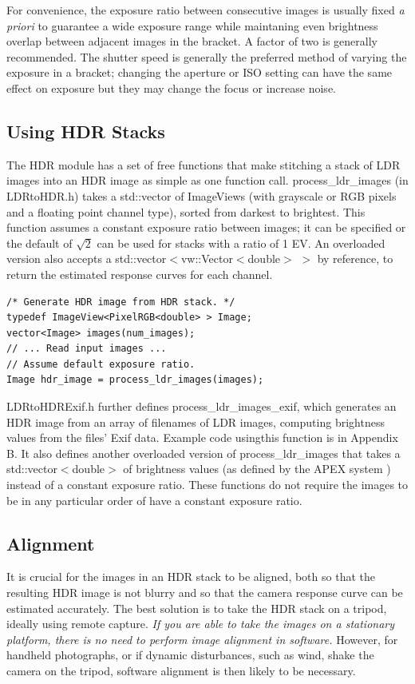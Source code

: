 For convenience, the exposure ratio between consecutive images is
usually fixed {\em a priori} to guarantee a wide exposure range while
maintaning even brightness overlap between adjacent images in the
bracket. A factor of two is generally recommended.  The shutter speed
is generally the preferred method of varying the exposure in a
bracket; changing the aperture or ISO setting can have the same effect
on exposure but they may change the focus or increase noise.

\subsection{Using HDR Stacks}
The HDR module has a set of free functions that make stitching a stack of LDR
images into an HDR image as simple as one function call. process\_ldr\_images (in 
LDRtoHDR.h) takes a std::vector of ImageViews (with grayscale or RGB pixels
and a floating point channel type), sorted from darkest to brightest. This
function assumes a constant exposure ratio between images; it can be specified
or the default of $\sqrt{2}$ can be used for stacks with a ratio of 1 EV. An
overloaded version also accepts a std::vector$<$vw::Vector$<$double$>$ $>$ by reference,
to return the estimated response curves for each channel.

\begin{verbatim}
/* Generate HDR image from HDR stack. */
typedef ImageView<PixelRGB<double> > Image;
vector<Image> images(num_images);
// ... Read input images ...
// Assume default exposure ratio.
Image hdr_image = process_ldr_images(images);
\end{verbatim}

LDRtoHDRExif.h further defines process\_ldr\_images\_exif, which generates an HDR
image from an array of filenames of LDR images, computing brightness values
from the files' Exif data. Example code usingthis function is in Appendix B. It
also defines another overloaded version of process\_ldr\_images that takes a
std::vector$<$double$>$ of brightness values (as defined by the APEX system \cite{apex})
instead of a constant exposure ratio. These functions do not require the images
to be in any particular order of have a constant exposure ratio.

\subsection{Alignment}
It is crucial for the images in an HDR stack to be aligned, both so
that the resulting HDR image is not blurry and so that the camera
response curve can be estimated accurately.  The best solution is to
take the HDR stack on a tripod, ideally using remote capture.  {\em If
  you are able to take the images on a stationary platform, there is
  no need to perform image alignment in software.}  However, for
handheld photographs, or if dynamic disturbances, such as wind, shake
the camera on the tripod, software alignment is then likely to be
necessary.

